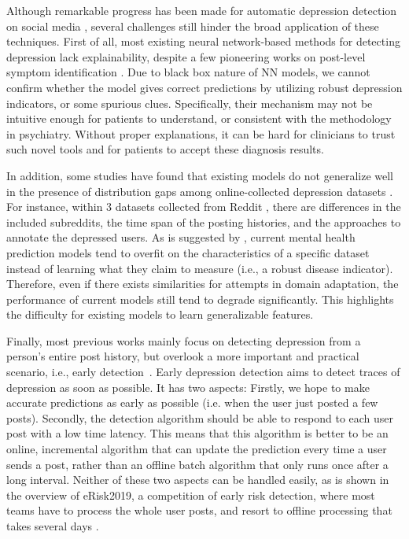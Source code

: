 Although remarkable progress has been made for automatic depression detection on social media \citep{trotzek2018utilizing, gui2019cooperative, zogan2021depressionnet}, several challenges still hinder the broad application of these techniques. First of all, most existing neural network-based methods for detecting depression lack explainability, despite a few pioneering works on post-level symptom identification \citep{mowery2017understanding}. Due to black box nature of NN models, we cannot confirm whether the model gives correct predictions by utilizing robust depression indicators, or some spurious clues. Specifically, their mechanism may not be intuitive enough for patients to understand, or 
consistent with the methodology in psychiatry. Without proper explanations, it can be hard for clinicians to trust such novel tools and for patients to accept these diagnosis results.

In addition, some studies have found that existing models do not generalize well 
in the presence of distribution gaps among online-collected depression 
datasets \citep{harrigian2020models}. For instance, within 3 datasets collected 
from Reddit \citep{losada2016test, yates2017depression, wolohan2018detecting}, 
there are differences in the included subreddits, the time span of the posting 
histories, and the approaches to annotate the depressed users. As is suggested by \citet{ernala2019methodological}, current mental health prediction models tend to overfit on the characteristics of a specific dataset instead of learning what they 
claim to measure (i.e., a robust disease indicator). Therefore, even if there exists similarities for attempts in domain adaptation, the performance of current models still tend to degrade significantly. This highlights the difficulty for existing models to learn generalizable features.

Finally, most previous works mainly focus on detecting depression from a person's entire post history, but overlook a more important and practical scenario, i.e.,
early detection~\citep{losada2017erisk}. Early depression detection aims to detect traces of depression as soon as possible. It has two aspects: Firstly, we hope to make accurate predictions as early as possible (i.e. when the user just posted a few posts). Secondly, the detection algorithm should be able to respond to each user post with a low time latency. This means that this algorithm is better to be an online, incremental algorithm that can update the prediction every time a user sends a post, rather than an offline batch algorithm that only runs once after a long interval. Neither of these two aspects can be handled easily, as is shown in the overview of eRisk2019, a competition of early risk detection, where most teams have to process the whole user posts, and resort to offline processing that takes several days \citep{losada2019overview}. 

